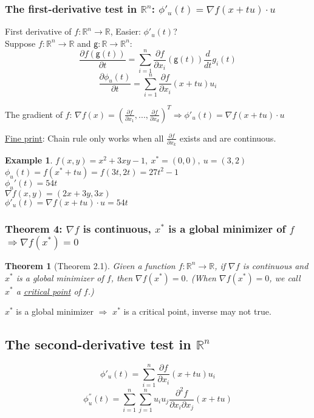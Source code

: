 \documentclass[11pt,a4paper]{article}
\newtheorem{theorem}{Theorem}
\newtheorem{example}{Example}
\begin{document}
\subsubsection{The first-derivative test in $\mathbb{R}^n$: $\phi'_u (t)=\nabla f(x+tu)\cdot u$}
First derivative of $f:\mathbb{R}^n \rightarrow \mathbb{R}$,
Easier: $\phi'_u (t)$?\\
Suppose $f:\mathbb{R}^n \rightarrow \mathbb{R}$ and $\mathsf{g}:\mathbb{R} \rightarrow \mathbb{R}^n$:
$$\frac{\partial f(\mathsf{g}(t))}{\partial t}=\sum_{i=1}^n \frac{\partial f}{\partial x_i}(\mathsf{g}(t))\frac{d}{dt}g_i(t)$$
$$\frac{\partial \phi_u (t)}{\partial t}=\sum_{i=1}^n \frac{\partial f}{\partial x_i}(x+tu)u_i$$

The gradient of $f$: $\nabla f(x)=(\frac{\partial f}{\partial x_1},..., \frac{\partial f}{\partial x_d})^T \Rightarrow \phi'_u (t)=\nabla f(x+tu)\cdot u$

\underline{Fine print}: Chain rule only works when all $\frac{\partial f}{\partial x_k}$ exists and are continuous.\\

\begin{example}
$f(x,y)=x^2+3xy-1,\ x^*=(0,0),\ u=(3,2)$\\
$\phi_u(t)=f(x^*+tu)=f(3t,2t)=27t^2-1$\\
$\phi_u'(t)=54t$\\
$\nabla f(x,y)=(2x+3y, 3x)$\\
$\phi'_u (t)=\nabla f(x+tu)\cdot u= 54t$
\end{example}

\subsubsection{Theorem 4: $\nabla f$ is continuous, $x^*$ is a global minimizer of $f$ $\Rightarrow \nabla f(x^*)=0$}
\begin{theorem}[Theorem 2.1]
    Given a function $f:\mathbb{R}^n \rightarrow \mathbb{R}$, if $\nabla f$ is continuous and $x^*$ is a global minimizer of
    $f$, then $\nabla f(x^*)=0$. (When $\nabla f(x^*)=0$, we call $x^*$ a \underline{critical point} of $f$.)
\end{theorem}
$x^*$ is a global minimizer $\Rightarrow$ $x^*$ is a critical point, inverse may not true.

\subsection{The second-derivative test in $\mathbb{R}^n$}
$$\phi'_u (t)=\sum_{i=1}^n \frac{\partial f}{\partial x_i}(x+tu)u_i$$
$$\phi^{''}_u (t)=\sum_{i=1}^n \sum_{j=1}^n u_iu_j\frac{\partial^2 f}{\partial x_i\partial x_j}(x+tu)$$
\end{document}
